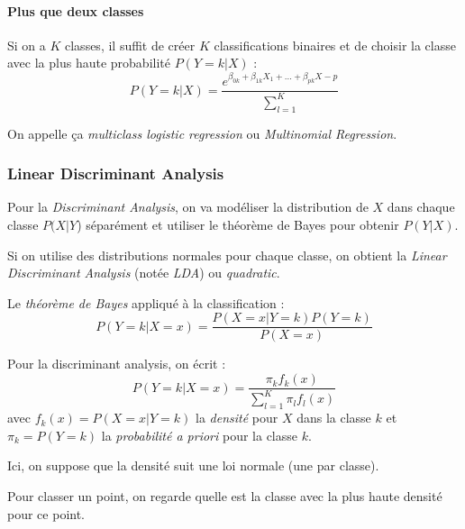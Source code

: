         \paragraph{Plus que deux classes}
        Si on a \(K\) classes, il suffit de créer \(K\) classifications binaires et de choisir la classe avec la plus haute probabilité \(P(Y = k | X)\) :
        \[
            P(Y = k | X) = \frac{e^{\beta_{0k} + \beta_{1k}X_1 + \dots + \beta_{pk}X-p}}{\sum_{l=1}^K}
        \]

        On appelle ça \textit{multiclass logistic regression} ou \textit{Multinomial Regression}.

    \subsubsection{Linear Discriminant Analysis}
        \begin{definition}
            Pour la \textit{Discriminant Analysis}, on va modéliser la distribution de \(X\) dans chaque classe \(P(X | Y\)) séparément et utiliser le théorème de Bayes pour obtenir \(P(Y | X)\).

            Si on utilise des distributions normales pour chaque classe, on obtient la \textit{Linear Discriminant Analysis} (notée \textit{LDA}) ou \textit{quadratic}.
        \end{definition}

        \begin{definition}
            Le \textit{théorème de Bayes} appliqué à la classification :
            \[
                P(Y = k | X = x) = \frac{P(X = x | Y = k)P(Y = k)}{P(X = x)}
            \]
        \end{definition}

        Pour la discriminant analysis, on écrit :
        \[
            P(Y = k | X = x) = \frac{\pi_k f_k(x)}{\sum_{l=1}^K \pi_l f_l(x)}
        \]
        avec \(f_k(x) = P(X = x | Y = k)\) la \textit{densité} pour \(X\) dans la classe \(k\) et \(\pi_k = P(Y = k)\) la \textit{probabilité a priori} pour la classe \(k\).

        Ici, on suppose que la densité suit une loi normale (une par classe).

        Pour classer un point, on regarde quelle est la classe avec la plus haute densité pour ce point.

